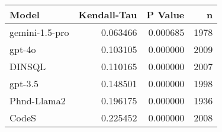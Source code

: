 \begin{tabular}{lrrr}
\toprule
Model & Kendall-Tau & P Value & n \\
\midrule
gemini-1.5-pro & 0.063466 & 0.000685 & 1978 \\
gpt-4o & 0.103105 & 0.000000 & 2009 \\
DINSQL & 0.110165 & 0.000000 & 2007 \\
gpt-3.5 & 0.148501 & 0.000000 & 1998 \\
Phnd-Llama2 & 0.196175 & 0.000000 & 1936 \\
CodeS & 0.225452 & 0.000000 & 2008 \\
\bottomrule
\end{tabular}
